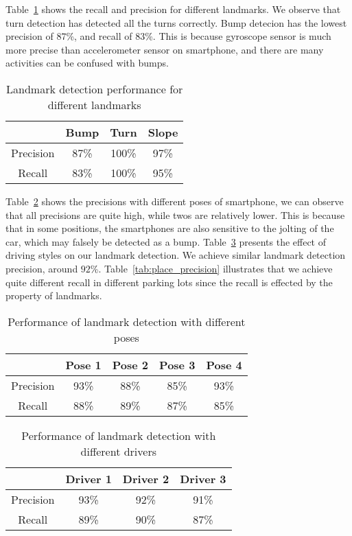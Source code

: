 Table~\ref{tab:landmark_precision} shows the recall and precision for different landmarks. We observe that turn detection has detected all the turns correctly. Bump detecion has the lowest precision of $87$\%, and recall of $83$\%. This is because gyroscope sensor is much more precise than accelerometer sensor on smartphone, and there are many activities can be confused with bumps.

\begin{table}[!hbp]
\caption{Landmark detection performance for different landmarks}
\centering
\begin{tabular}{|c|c|c|c|}
\hline
 & Bump & Turn & Slope\\
\hline
Precision & 87\% & 100\% & 97\%\\
\hline
Recall & 83\% & 100\% & 95\%\\
\hline
\end{tabular}
\label{tab:landmark_precision}
\end{table}

Table~\ref{tab:pose_precision} shows the precisions with different poses of smartphone, we can observe that all precisions are quite high, while twos are relatively lower. This is because that in some positions, the smartphones are also sensitive to the jolting of the car, which may falsely be detected as a bump. Table~\ref{tab:style_precision} presents the effect of driving styles on our landmark detection. We achieve similar landmark detection precision, around $92$\%. Table~\ref{tab:place_precision} illustrates that we achieve quite different recall in different parking lots since the recall is effected by the property of landmarks.



\begin{table}[!hbp]
\caption{Performance of landmark detection with different poses}
\centering
\begin{tabular}{|c|c|c|c|c|}
\hline
 & Pose 1& Pose 2& Pose 3& Pose 4\\
\hline
Precision & 93\% & 88\% & 85\% & 93\%\\
\hline
Recall & 88\% & 89\% & 87\% & 85\%\\
\hline
\end{tabular}
\label{tab:pose_precision}
\end{table}


\begin{table}[!hbp]
\caption{Performance of landmark detection with different drivers}
\centering
\begin{tabular}{|c|c|c|c|}
\hline
 & Driver 1& Driver 2& Driver 3\\
\hline
Precision & 93\% & 92\% & 91\%\\
\hline
Recall & 89\% & 90\% & 87\%\\
\hline
\end{tabular}
\label{tab:style_precision}
\end{table}


